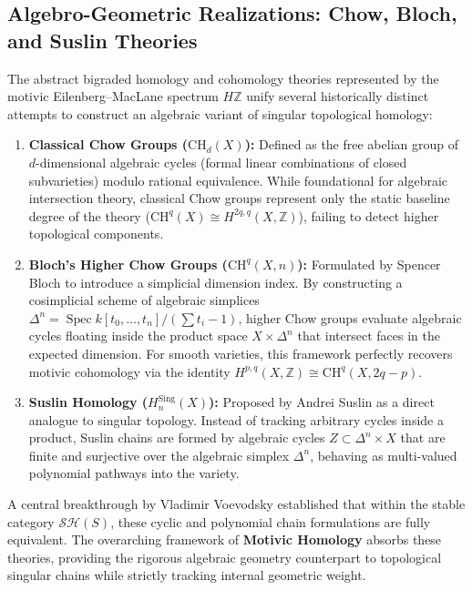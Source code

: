 \documentclass[11pt,oneside]{article}
\begin{document}
\subsection{Algebro-Geometric Realizations: Chow, Bloch, and Suslin Theories}
The abstract bigraded homology and cohomology theories represented by the motivic Eilenberg--MacLane spectrum $H\mathbb{Z}$ unify several historically distinct attempts to construct an algebraic variant of singular topological homology:
\begin{enumerate}
    \item \textbf{Classical Chow Groups ($\text{CH}_d(X)$):} Defined as the free abelian group of $d$-dimensional algebraic cycles (formal linear combinations of closed subvarieties) modulo rational equivalence. While foundational for algebraic intersection theory, classical Chow groups represent only the static baseline degree of the theory ($\text{CH}^q(X) \cong H^{2q,q}(X, \mathbb{Z})$), failing to detect higher topological components.
    \item \textbf{Bloch's Higher Chow Groups ($\text{CH}^q(X, n)$):} Formulated by Spencer Bloch to introduce a simplicial dimension index. By constructing a cosimplicial scheme of algebraic simplices $\Delta^n = \operatorname{Spec} k[t_0, \dots, t_n]/(\sum t_i - 1)$, higher Chow groups evaluate algebraic cycles floating inside the product space $X \times \Delta^n$ that intersect faces in the expected dimension. For smooth varieties, this framework perfectly recovers motivic cohomology via the identity $H^{p,q}(X, \mathbb{Z}) \cong \text{CH}^q(X, 2q-p)$.
    \item \textbf{Suslin Homology ($H_n^{\text{Sing}}(X)$):} Proposed by Andrei Suslin as a direct analogue to singular topology. Instead of tracking arbitrary cycles inside a product, Suslin chains are formed by algebraic cycles $Z \subset \Delta^n \times X$ that are finite and surjective over the algebraic simplex $\Delta^n$, behaving as multi-valued polynomial pathways into the variety. 
\end{enumerate}
A central breakthrough by Vladimir Voevodsky established that within the stable category $\mathcal{S}\mathcal{H}(S)$, these cyclic and polynomial chain formulations are fully equivalent. The overarching framework of \textbf{Motivic Homology} absorbs these theories, providing the rigorous algebraic geometry counterpart to topological singular chains while strictly tracking internal geometric weight.
\end{document}
